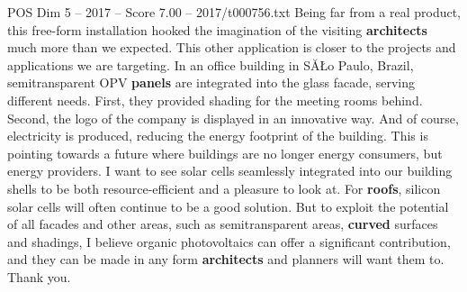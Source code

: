 \begin{textsample}{POS Dim 5 – 2017 – Score 7.00 – 2017/t000756.txt}
Being far from a real product, this free-form installation hooked the imagination of the visiting \textbf{architects} much more than we expected.
This other application is closer to the projects and applications we are targeting.
In an office building in SĂŁo Paulo, Brazil, semitransparent OPV \textbf{panels} are integrated into the glass facade, serving different needs.
First, they provided shading for the meeting rooms behind.
Second, the logo of the company is displayed in an innovative way.
And of course, electricity is produced, reducing the energy footprint of the building.
This is pointing towards a future where buildings are no longer energy consumers, but energy providers.
I want to see solar cells seamlessly integrated into our building shells to be both resource-efficient and a pleasure to look at.
For \textbf{roofs}, silicon solar cells will often continue to be a good solution.
But to exploit the potential of all facades and other areas, such as semitransparent areas, \textbf{curved} surfaces and shadings, I believe organic photovoltaics can offer a significant contribution, and they can be made in any form \textbf{architects} and planners will want them to.
Thank you.

\end{textsample}
